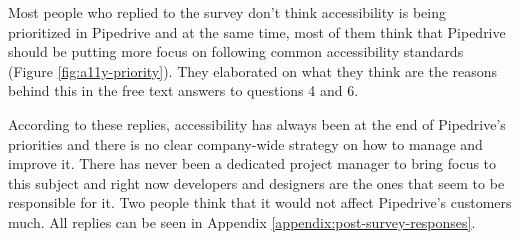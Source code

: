 \documentclass{master_thesis}
\begin{document}
Most people who replied to the survey don't think accessibility is being prioritized in Pipedrive and at the same time, most of them think that Pipedrive should be putting more focus on following common accessibility standards (Figure \ref{fig:a11y-priority}). They elaborated on what they think are the reasons behind this in the free text answers to questions 4 and 6.

According to these replies, accessibility has always been at the end of Pipedrive's priorities and there is no clear company-wide strategy on how to manage and improve it. There has never been a dedicated project manager to bring focus to this subject
and right now developers and designers are the ones that seem to be responsible for it.
Two people think that it would not affect Pipedrive's customers much. All replies can be seen in  Appendix \ref{appendix:post-survey-responses}.
\end{document}
